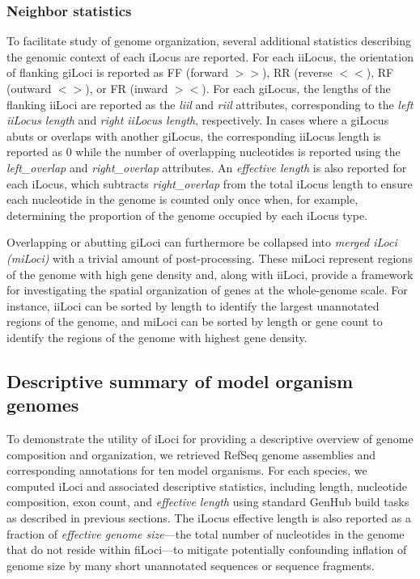 \subsubsection*{Neighbor statistics}

To facilitate study of genome organization, several additional statistics describing the genomic context of each iLocus are reported.
For each iiLocus, the orientation of flanking giLoci is reported as FF (forward $>>$), RR (reverse $<<$), RF (outward $<>$), or FR (inward $><$).
For each giLocus, the lengths of the flanking iiLoci are reported as the \textit{liil} and \textit{riil} attributes, corresponding to the \textit{left iiLocus length} and \textit{right iiLocus length}, respectively.
In cases where a giLocus abuts or overlaps with another giLocus, the corresponding iiLocus length is reported as 0 while the number of overlapping nucleotides is reported using the \textit{left\_overlap} and \textit{right\_overlap} attributes.
An \textit{effective length} is also reported for each iLocus, which subtracts \textit{right\_overlap} from the total iLocus length to ensure each nucleotide in the genome is counted only once when, for example, determining the proportion of the genome occupied by each iLocus type.

Overlapping or abutting giLoci can furthermore be collapsed into \textit{merged iLoci (miLoci)} with a trivial amount of post-processing.
These miLoci represent regions of the genome with high gene density and, along with iiLoci, provide a framework for investigating the spatial organization of genes at the whole-genome scale.
For instance, iiLoci can be sorted by length to identify the largest unannotated regions of the genome, and miLoci can be sorted by length or gene count to identify the regions of the genome with highest gene density.

\subsection*{Descriptive summary of model organism genomes}

To demonstrate the utility of iLoci for providing a descriptive overview of genome composition and organization, we retrieved RefSeq genome assemblies and corresponding annotations for ten model organisms.
For each species, we computed iLoci and associated descriptive statistics, including length, nucleotide composition, exon count, and \textit{effective length} using standard GenHub build tasks as described in previous sections.
The iLocus effective length is also reported as a fraction of \textit{effective genome size}---the total number of nucleotides in the genome that do not reside within fiLoci---to mitigate potentially confounding inflation of genome size by many short unannotated sequences or sequence fragments.

